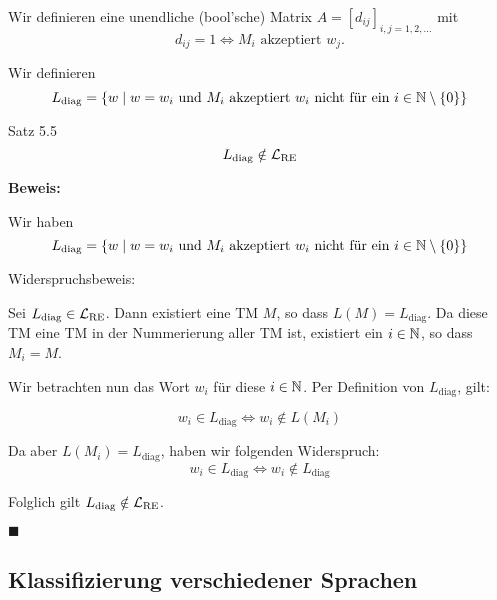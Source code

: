    Wir definieren eine unendliche (bool'sche) Matrix $A = [d_{ij}]_{i,j = 1, 2, ...}$ mit 
    $$d_{ij} = 1 \iff M_i \text{ akzeptiert }w_j.$$

    Wir definieren
    $$L_{\text{diag}} = \{w \mid w = w_i \text{ und $M_i$ akzeptiert $w_i$ nicht für ein $i \in \mathbb{N}\setminus\{0\}$}\}$$


    \begin{mainbox}{Satz 5.5}
        $$L_{\text{diag}} \notin \mathcal{L}_{\text{RE}}$$
    \end{mainbox}

    \textbf{Beweis:}

    Wir haben 
    $$L_{\text{diag}} = \{w \mid w = w_i \text{ und $M_i$ akzeptiert $w_i$ nicht für ein $i \in \mathbb{N}\setminus\{0\}$}\}$$

    Widerspruchsbeweis:

    Sei $L_\text{diag} \in \mathcal{L}_{\text{RE}}$. Dann existiert eine TM $M$, so dass $L(M) = L_\text{diag}$. Da diese TM eine TM in der Nummerierung aller TM ist, existiert ein $i \in \mathbb{N}$, so dass $M_i = M$.

    Wir betrachten nun das Wort $w_i$ für diese $i \in \mathbb{N}$. Per Definition von $L_\text{diag}$, gilt:

    $$w_i \in L_\text{diag} \iff w_i \notin L(M_i)$$

    Da aber $L(M_i) = L_\text{diag}$, haben wir folgenden Widerspruch:
    $$w_i \in L_\text{diag} \iff w_i \notin L_\text{diag}$$

    Folglich gilt $L_\text{diag} \notin \mathcal{L}_\text{RE}$.
    
    \hspace*{0pt}\hfill$\blacksquare$


    
        \subsection{Klassifizierung verschiedener Sprachen}
    
